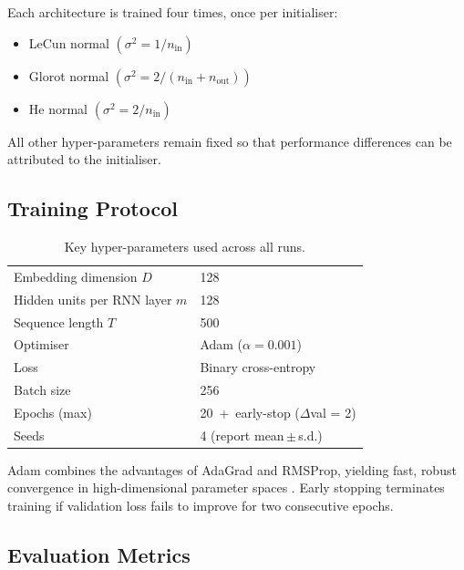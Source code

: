 \documentclass[conference]{IEEEtran}
\begin{document}
Each architecture is trained four times, once per initialiser:

\begin{itemize}
  \item LeCun normal $(\sigma^2=1/n_{\text{in}})$
  \item Glorot normal
        $(\sigma^2=2/(n_{\text{in}}+n_{\text{out}}))$
  \item He normal $(\sigma^2=2/n_{\text{in}})$
\end{itemize}

All other hyper-parameters remain fixed so that performance differences can
be attributed to the initialiser.

\subsection{Training Protocol}

\begin{table}[!t]
  \caption{Key hyper-parameters used across all runs.}
  \label{tab:hyper}
  \centering
  \begin{tabular}{@{}ll@{}}
    \toprule
    Embedding dimension $D$          & 128\\
    Hidden units per RNN layer $m$   & 128\\
    Sequence length $T$              & 500\\
    Optimiser                        & Adam ($\alpha{=}0.001$) \cite{kingma2015adam}\\
    Loss                             & Binary cross-entropy\\
    Batch size                       & 256\\
    Epochs (max)                     & 20 \,+\, early-stop ($\Delta\!$val = 2)\\
    Seeds                            & 4 (report mean\,$\pm$\,s.d.)\\
    \bottomrule
  \end{tabular}
\end{table}

Adam combines the advantages of AdaGrad and RMSProp, yielding
fast, robust convergence in high-dimensional parameter spaces \cite{kingma2015adam}.
Early stopping terminates training if validation loss fails to improve
for two consecutive epochs.

\subsection{Evaluation Metrics}
\end{document}
